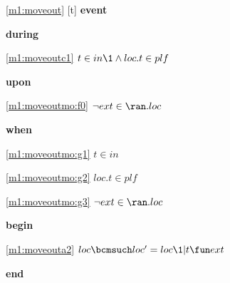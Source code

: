 \noindent \ref{m1:moveout} [t] \textbf{event}
\begin{block}
  \item   \textbf{during}
  \begin{block}
  \item[ \eqref{m1:moveoutc1} ]$t \in in  %
  		\1\land loc.t \in plf $ %
  \end{block}
  \item   \textbf{upon}
  \begin{block}
  \item[ \eqref{m1:moveoutmo:f0} ]$\neg ext \in \ran. loc $ %
  \end{block}
  \item   \textbf{when}
  \begin{block}
  \item[ \eqref{m1:moveoutmo:g1} ]$t \in in $ %
  \item[ \eqref{m1:moveoutmo:g2} ]$loc.t \in plf $ %
  \item[ \eqref{m1:moveoutmo:g3} ]$\neg ext \in \ran. loc $ %
  \end{block}
  \item   \textbf{begin}
  \begin{block}
  \item[ \eqref{m1:moveouta2} ]$loc \bcmsuch loc' = loc \1 | t \fun ext $ %
  \end{block}
  \item   \textbf{end} \\
\end{block}
